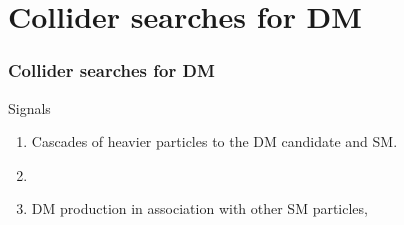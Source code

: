 \documentclass{beamer}
\numberwithin{figure}{section}
\begin{document}
\section{Collider searches for DM}
\begin{frame}
\frametitle{Collider searches for DM}

\begin{alertblock}{Signals}
	\begin{enumerate}
		\item Cascades of heavier particles to the DM candidate and SM.
		\item[]
		\item DM production in association with other SM particles,	
	\end{enumerate}
\end{alertblock}

\end{frame}
\end{document}
